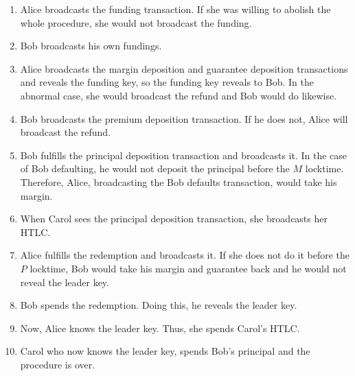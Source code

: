 \documentclass{article}
\begin{document}
\begin{enumerate}
    \item Alice broadcasts the funding transaction. If she was willing to abolish the whole procedure, she would not broadcast the funding.
    \item Bob broadcasts his own fundings.
    \item Alice broadcasts the margin deposition and guarantee deposition transactions and reveals the funding key, so the funding key reveals to Bob. In the abnormal case, she would broadcast the refund and Bob would do likewise.
    \item Bob broadcasts the premium deposition transaction. If he does not, Alice will broadcast the refund. 
    \item Bob fulfills the principal deposition transaction and broadcasts it. In the case of Bob defaulting, he would not deposit the principal before the $M$ locktime. Therefore, Alice, broadcasting the Bob defaults transaction, would take his margin. %
    
    \item When Carol sees the principal deposition transaction, she broadcasts her HTLC. %
    \item Alice fulfills the redemption and broadcasts it. If she does not do it before the $P$ locktime, Bob would take his margin and guarantee back and he would not reveal the leader key.
    \item Bob spends the redemption. Doing this, he reveals the leader key.
    \item Now, Alice knows the leader key. Thus, she spends Carol's HTLC.
    \item Carol who now knows the leader key, spends Bob's principal and the procedure is over.
\end{enumerate}



\end{document}
